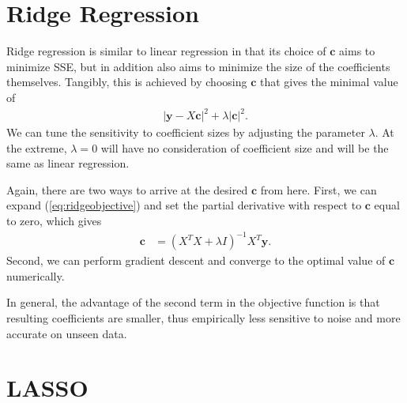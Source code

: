 \documentclass[10pt]{paper}
\begin{document}
\section{Ridge Regression}

Ridge regression is similar to linear regression in that its choice of $\bm{c}$ aims to minimize SSE, but in addition also aims to minimize the size of the coefficients themselves. Tangibly, this is achieved by choosing $\bm{c}$ that gives the minimal value of
\begin{align}
\left| \bm{y} - X \bm{c} \right|^2 + \lambda \left| \bm{c} \right|^2. \label{eq:ridgeobjective}
\end{align}
We can tune the sensitivity to coefficient sizes by adjusting the parameter $\lambda$. At the extreme, $\lambda = 0$ will have no consideration of coefficient size and will be the same as linear regression.

Again, there are two ways to arrive at the desired $\bm{c}$ from here. First, we can expand (\ref{eq:ridgeobjective}) and set the partial derivative with respect to $\bm{c}$ equal to zero, which gives
\begin{align*}
\bm{c} &= \left( X^T X + \lambda I \right)^{-1} X^T \bm{y}. \label{eq:ridgeclosed}
\end{align*}
Second, we can perform gradient descent and converge to the optimal value of $\bm{c}$ numerically.

In general, the advantage of the second term in the objective function is that resulting coefficients are smaller, thus empirically less sensitive to noise and more accurate on unseen data.


\section{LASSO}
\end{document}
